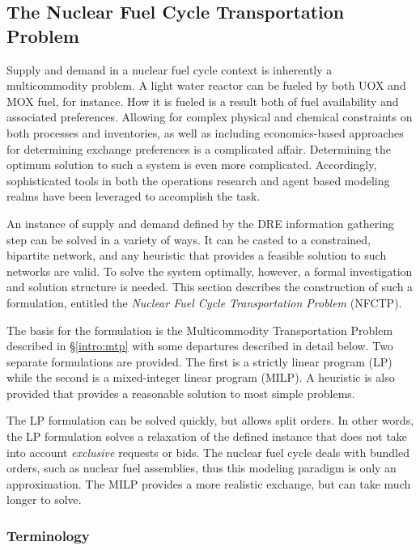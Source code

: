 \subsection{The Nuclear Fuel Cycle Transportation Problem}\label{abm:dre:fctp}

Supply and demand in a nuclear fuel cycle context is inherently a multicommodity
problem. A light water reactor can be fueled by both UOX and MOX fuel, for
instance. How it is fueled is a result both of fuel availability and associated
preferences. Allowing for complex physical and chemical constraints on both
processes and inventories, as well as including economics-based approaches for
determining exchange preferences is a complicated affair. Determining the
optimum solution to such a system is even more complicated. Accordingly,
sophisticated tools in both the operations research and agent based modeling
realms have been leveraged to accomplish the task.

An instance of supply and demand defined by the DRE information gathering step
can be solved in a variety of ways. It can be casted to a constrained, bipartite
network, and any heuristic that provides a feasible solution to such networks
are valid. To solve the system optimally, however, a formal investigation and
solution structure is needed. This section describes the construction of such a
formulation, entitled the \textit{Nuclear Fuel Cycle Transportation Problem}
(NFCTP).

The basis for the formulation is the Multicommodity Transportation Problem
described in \S\ref{intro:mtp} with some departures described in detail
below. Two separate formulations are provided. The first is a strictly linear
program (LP) while the second is a mixed-integer linear program (MILP). A
heuristic is also provided that provides a reasonable solution to most simple
problems.

The LP formulation can be solved quickly, but allows split orders. In other
words, the LP formulation solves a relaxation of the defined instance that does
not take into account \textit{exclusive} requests or bids. The nuclear fuel
cycle deals with bundled orders, such as nuclear fuel assemblies, thus this
modeling paradigm is only an approximation. The MILP provides a more realistic
exchange, but can take much longer to solve. 

\subsubsection{Terminology}

